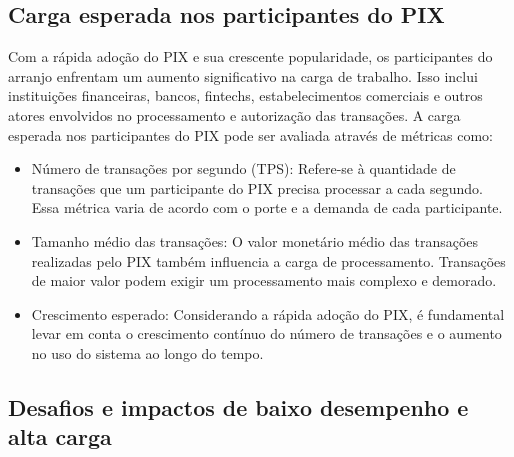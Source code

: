 \documentclass[12pt]{article}
\begin{document}
\subsection{Carga esperada nos participantes do PIX}  \label{sec:firstpage}

Com a rápida adoção do PIX e sua crescente popularidade, os participantes do arranjo enfrentam um aumento significativo na carga de trabalho. Isso inclui instituições financeiras, bancos, fintechs, estabelecimentos comerciais e outros atores envolvidos no processamento e autorização das transações. A carga esperada nos participantes do PIX pode ser avaliada através de métricas como:
\begin{itemize}
\item Número de transações por segundo (TPS): Refere-se à quantidade de transações que um participante do PIX precisa processar a cada segundo. Essa métrica varia de acordo com o porte e a demanda de cada participante.

\item Tamanho médio das transações: O valor monetário médio das transações realizadas pelo PIX também influencia a carga de processamento. Transações de maior valor podem exigir um processamento mais complexo e demorado.

\item Crescimento esperado: Considerando a rápida adoção do PIX, é fundamental levar em conta o crescimento contínuo do número de transações e o aumento no uso do sistema ao longo do tempo.
\end{itemize}
\subsection{Desafios e impactos de baixo desempenho e alta carga}  \label{sec:firstpage}
\end{document}
